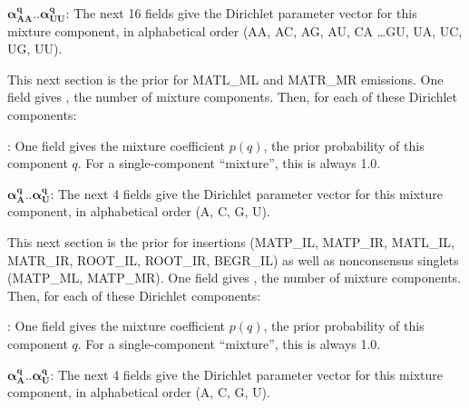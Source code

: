 \begin{description}
\begin{description}
     \item{$\mathbf{\alpha^q_{AA}..\alpha^q_{UU}}$:} The next 16 fields give the
     Dirichlet parameter vector for this mixture component, in alphabetical
     order (AA, AC, AG, AU, CA \ldots GU, UA, UC, UG, UU). 
     \end{description}

\item[\textbf{Consensus singlet base emission prior section.}] This
  next section is the prior for MATL\_ML and MATR\_MR emissions.
  One field gives , the
  number of mixture components. Then, for each of these 
  Dirichlet components:
     \begin{description}
     \item{:} One field gives the mixture coefficient $p(q)$,
     the prior probability of this component $q$. For a single-component
     ``mixture'', this is always 1.0.

     \item{$\mathbf{\alpha^q_A..\alpha^q_U}$:} The next 4 fields give the
     Dirichlet parameter vector for this mixture component, in alphabetical
     order (A, C, G, U).
     \end{description}
  
\item[\textbf{Nonconsensus singlet base emission prior section.}] This
  next section is the prior for insertions (MATP\_IL, MATP\_IR,
  MATL\_IL, MATR\_IR, ROOT\_IL, ROOT\_IR, BEGR\_IL) as well as
  nonconsensus singlets (MATP\_ML, MATP\_MR). 
  One field gives , the
  number of mixture components. Then, for each of these 
  Dirichlet components:
     \begin{description}
     \item{:} One field gives the mixture coefficient $p(q)$,
     the prior probability of this component $q$. For a single-component
     ``mixture'', this is always 1.0.

     \item{$\mathbf{\alpha^q_A..\alpha^q_U}$:} The next 4 fields give the
     Dirichlet parameter vector for this mixture component, in alphabetical
     order (A, C, G, U).
     \end{description}
\end{description}


